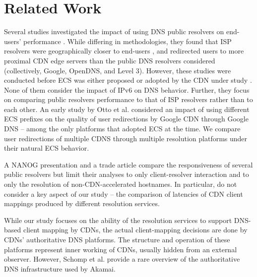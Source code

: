 \section{Related Work}
\label{sec:related}

Several studies investigated the impact of using DNS public resolvers on end-users' performance \cite{ager2010comparing,huang2011public,otto2012content,hours2016study}. 
While differing in methodologies, they found that ISP resolvers 
were geographically closer to end-users \cite{huang2011public}, 
and  redirected users to more proximal CDN edge servers \cite{ager2010comparing,huang2011public,hours2016study} than the public DNS resolvers considered (collectively, Google, OpenDNS, and Level 3). However, these studies were conducted  before ECS was either proposed \cite{ager2010comparing,huang2011public} or adopted by the CDN under study \cite{hours2016study}. None of them consider the impact of IPv6 on DNS behavior.  Further, they focus on comparing public resolvers performance to that of ISP resolvers rather than to each other. An early study by Otto et al. \cite{otto2012content} considered an impact of using different ECS prefixes on the quality of user redirections by Google CDN through Google DNS -- among the only platforms that adopted ECS at the time.  We compare user redirections of multiple CDNS through multiple resolution platforms under their natural ECS behavior.

A NANOG presentation
\cite{DNS_resolvers_NANOG18} and a trade article \cite{DZone} compare the responsiveness of several public resolvers but limit their analyses to only client-resolver interaction and to only the resolution of non-CDN-accelerated hostnames.  In particular, \cite{DNS_resolvers_NANOG18,DZone} do not consider a key aspect of our study -- the comparison of latencies of CDN client mappings produced by different resolution services. 


While our study focuses on the ability of the resolution services to support DNS-based client mapping by CDNs, the actual client-mapping decisions are done by CDNs' authoritative DNS platforms. The structure and operation of these platforms represent inner working of CDNs, usually hidden from an external observer.  However, Schomp et al. \cite{Schomp2020AkamaiDNS} provide a rare overview of the authoritative DNS infrastructure used by Akamai.  


